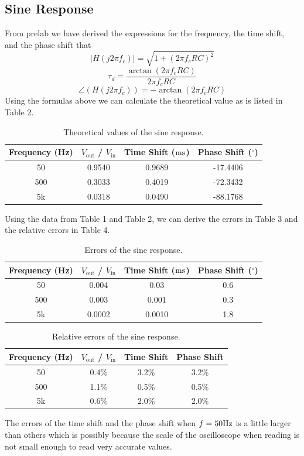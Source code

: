 \documentclass[a4paper]{article}
\begin{document}
\subsection{Sine Response}
From prelab we have derived the expressions for the frequency, the time shift, and the phase shift that
$$|H(j2\pi f_c)|=\sqrt{1+(2\pi f_cRC)^2}$$
$$\tau_d=\frac{\arctan(2\pi f_cRC)}{2\pi f_cRC}$$
$$\angle(H(j2\pi f_c))=-\arctan(2\pi f_cRC)$$
Using the formulas above we can calculate the theoretical value as is listed in Table 2.
\begin{table}[H]
	\centering
	\begin{tabular}{|c|c|c|c|}
		\hline
		Frequency (Hz)&$V_\text{out}$ / $V_\text{in}$&Time Shift ($\rm{ms}$)&Phase Shift ($^\circ$)\\
		\hline
		50&0.9540&0.9689&-17.4406\\
		\hline
		500&0.3033&0.4019&-72.3432\\
		\hline
		5k&0.0318&0.0490&-88.1768\\
		\hline
	\end{tabular}
	\caption{Theoretical values of the sine response.}
\end{table}
Using the data from Table 1 and Table 2, we can derive the errors in Table 3 and the relative errors in Table 4.
\begin{table}[H]
	\centering
	\begin{tabular}{|c|c|c|c|}
		\hline
		Frequency (Hz)&$V_\text{out}$ / $V_\text{in}$&Time Shift ($\rm{ms}$)&Phase Shift ($^\circ$)\\
		\hline
		50&0.004&0.03&0.6\\
		\hline
		500&0.003&0.001&0.3\\
		\hline
		5k&0.0002&0.0010&1.8\\
		\hline
	\end{tabular}
	\caption{Errors of the sine response.}
\end{table}
\begin{table}[H]
	\centering
	\begin{tabular}{|c|c|c|c|}
		\hline
		Frequency (Hz)&$V_\text{out}$ / $V_\text{in}$&Time Shift&Phase Shift\\
		\hline
		50&0.4\%&3.2\%&3.2\% \\
		\hline
		500&1.1\%&0.5\%&0.5\%\\
		\hline
		5k&0.6\%&2.0\%&2.0\%\\
		\hline
	\end{tabular}
	\caption{Relative errors of the sine response.}
\end{table}
The errors of the time shift and the phase shift when $f=50\rm{Hz}$ is a little larger than others which is possibly because the scale of the oscilloscope when reading is not small enough to read very accurate values.
\end{document}
